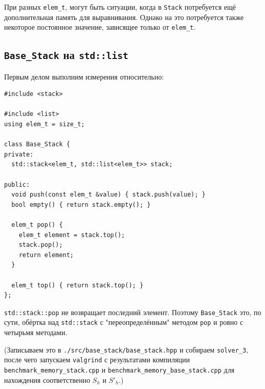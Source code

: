 \begin{mdframed}[style=mdfStyleCode]%
  \begin{remark}\rm%
  При разных \texttt{elem_t}, могут быть ситуации, когда в \texttt{Stack} потребуется ещё дополнительная память для выравнивания. Однако на это потребуется также некоторое постоянное значение, зависящее только от \texttt{elem_t}.
\end{remark}
\end{mdframed}

\subsection{\texttt{Base_Stack} на \texttt{std::list}}

Первым делом выполним измерения относительно:
\begin{verbatim}
#include <stack>

#include <list>
using elem_t = size_t;

class Base_Stack {
private:
  std::stack<elem_t, std::list<elem_t>> stack;

public:
  void push(const elem_t &value) { stack.push(value); }
  bool empty() { return stack.empty(); }

  elem_t pop() {
    elem_t element = stack.top();
    stack.pop();
    return element;
  }

  elem_t top() { return stack.top(); }
};
\end{verbatim}
\begin{mdframed}[style=mdfStyleCode]%
  \begin{remark}\rm%
  \texttt{std::stack::pop} не возвращает последний элемент. Поэтому \texttt{Base_Stack} это, по сути, обёртка над \texttt{std::stack} с "переопределённым" методом \texttt{pop} и ровно с четырьмя методами.
\end{remark}
\end{mdframed}

(Записываем это в \texttt{./src/base_stack/base_stack.hpp} и собираем \texttt{solver_3}, после чего запускаем \texttt{valgrind} с результатами компиляции \texttt{benchmark_memory_stack.cpp} и \texttt{benchmark_memory}\-\texttt{_base_stack.cpp} для нахождения соответственно \(S_{h}\) и \(S'_{h}\).)

